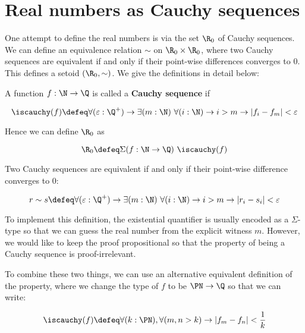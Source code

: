 \section{Real numbers as Cauchy sequences}


One attempt to define the real numbers is via the set $\R_0$ of Cauchy sequences.
We can define an equivalence relation $\sim$ on $\R_0 \times \R_0$, where two Cauchy sequences are equivalent if and only if their point-wise differences converges to $0$.
This defines a setoid $(\R_0, \sim)$.
We give the definitions in detail below:


\begin{definition}\label{R01}

A function $f : \N \to \Q$ is called a \textbf{Cauchy sequence} if 

\begin{equation}
  \iscauchy(f) \defeq \forall(\varepsilon
  :\Q^{+}) \to \exists (m:\N) ~ \forall (i:\N) \to i>m\to \vert  f_i -
  f_m \vert  <\varepsilon
\end{equation}

Hence we can define $\R_0$ as

$$\R_0 \defeq \Sigma (f : \N \to \Q) ~\iscauchy(f)$$
\end{definition}

Two Cauchy sequences are equivalent if and only if their point-wise difference converges to $0$:

$$r \sim s \defeq \forall (\varepsilon :\Q^{+}) \to \exists (m:\N) ~
\forall (i:\N) \to i>m\to \vert  r_i - s_i \vert <\varepsilon$$



To implement this definition, the existential quantifier is usually encoded as a $\Sigma$-type so that we can guess the real number from the explicit witness $m$.
However, we would like to keep the proof propositional so that the property of being a Cauchy sequence is proof-irrelevant. 

To combine these two things, we can use an alternative equivalent definition of the property, where we change the type of $f$ to be $\PN \to \Q$ so that we can write:

\begin{equation}\label{R02}
\iscauchy(f) \defeq \forall (k :\PN),\forall (m , n > k) \to \vert  f_m -
  f_n \vert  < \frac{1}{k}
\end{equation}

